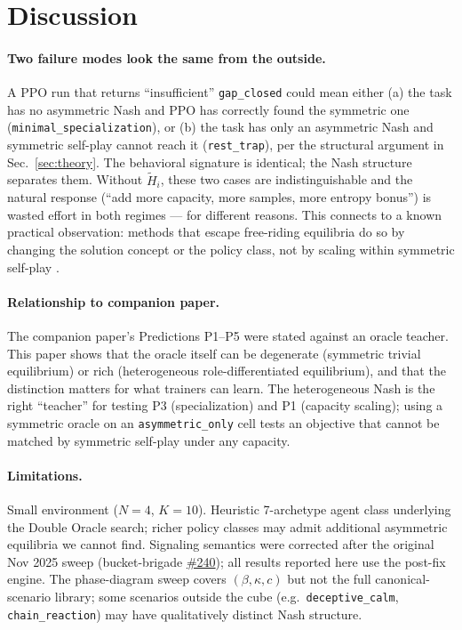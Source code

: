 \documentclass{article}
\begin{document}
\section{Discussion}

\paragraph{Two failure modes look the same from the outside.}
A PPO run that returns ``insufficient'' \texttt{gap\_closed} could mean either
(a) the task has no asymmetric Nash and PPO has correctly found the symmetric
one (\texttt{minimal\_specialization}), or (b) the task has only an asymmetric
Nash and symmetric self-play cannot reach it (\texttt{rest\_trap}), per the
structural argument in Sec.~\ref{sec:theory}.  The behavioral signature is
identical; the Nash structure separates them.  Without $\tilde{H}_i$, these
two cases are indistinguishable and the natural response (``add more capacity,
more samples, more entropy bonus'') is wasted effort in both regimes — for
different reasons.  This connects to a known practical observation: methods
that escape free-riding equilibria do so by changing the solution concept or
the policy class, not by scaling within symmetric self-play
\cite{liu2023lazy,marris2021ce}.

\paragraph{Relationship to companion paper.}
The companion paper's Predictions P1--P5 were stated against an oracle teacher.
This paper shows that the oracle itself can be degenerate (symmetric trivial
equilibrium) or rich (heterogeneous role-differentiated equilibrium), and that
the distinction matters for what trainers can learn.  The heterogeneous Nash
is the right ``teacher'' for testing P3 (specialization) and P1 (capacity
scaling); using a symmetric oracle on an \texttt{asymmetric\_only} cell tests
an objective that cannot be matched by symmetric self-play under any capacity.

\paragraph{Limitations.}
Small environment ($N=4$, $K=10$).  Heuristic 7-archetype agent class
underlying the Double Oracle search; richer policy classes may admit
additional asymmetric equilibria we cannot find.  Signaling semantics were
corrected after the original Nov 2025 sweep
(bucket-brigade \href{https://github.com/rjwalters/bucket-brigade/issues/240}{\#240});
all results reported here use the post-fix engine.  The phase-diagram sweep
covers $(\beta, \kappa, c)$ but not the full canonical-scenario library; some
scenarios outside the cube (e.g.\ \texttt{deceptive\_calm}, \texttt{chain\_reaction})
may have qualitatively distinct Nash structure.
\end{document}
